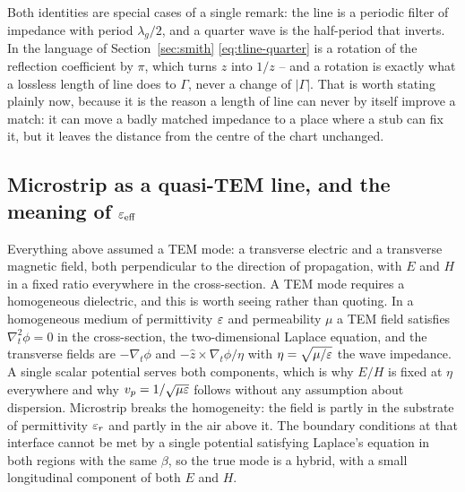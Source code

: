 Both identities are special cases of a single remark: the line is a periodic filter of impedance with period
$\lambda_g/2$, and a quarter wave is the half-period that inverts. In the language of Section~\ref{sec:smith}
\eqref{eq:tline-quarter} is a rotation of the reflection coefficient by $\pi$, which turns $z$ into $1/z$ -- and
a rotation is exactly what a lossless length of line does to $\Gamma$, never a change of $|\Gamma|$. That is
worth stating plainly now, because it is the reason a length of line can never by itself improve a match: it can
move a badly matched impedance to a place where a stub can fix it, but it leaves the distance from the centre of
the chart unchanged.

\subsection{Microstrip as a quasi-TEM line, and the meaning of $\varepsilon_{\mathrm{eff}}$}
\label{sec:tline-epseff}

Everything above assumed a TEM mode: a transverse electric and a transverse magnetic field, both perpendicular
to the direction of propagation, with $E$ and $H$ in a fixed ratio everywhere in the cross-section. A TEM mode
requires a homogeneous dielectric, and this is worth seeing rather than quoting. In a homogeneous medium of
permittivity $\varepsilon$ and permeability $\mu$ a TEM field satisfies $\nabla_t^2 \phi=0$ in the cross-section, the
two-dimensional Laplace equation, and the transverse fields are $-\nabla_t\phi$ and
$-\hat z\times\nabla_t\phi/\eta$ with $\eta=\sqrt{\mu/\varepsilon}$ the wave impedance. A single scalar potential serves
both components, which is why $E/H$ is fixed at $\eta$ everywhere and why $v_p=1/\sqrt{\mu\varepsilon}$ follows without
any assumption about dispersion. Microstrip breaks the homogeneity: the field is partly in the substrate of
permittivity $\varepsilon_r$ and partly in the air above it. The boundary conditions at that interface cannot be met by
a single potential satisfying Laplace's equation in both regions with the same $\beta$, so the true mode is a
hybrid, with a small longitudinal component of both $E$ and $H$.

